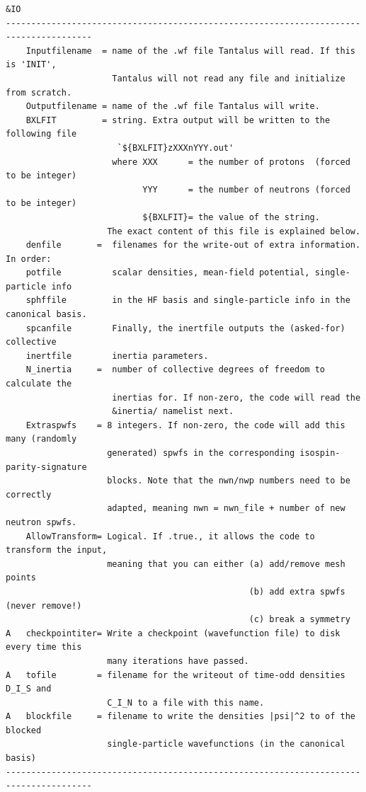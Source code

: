 \documentclass[print,amsmath,amssymb,aps,prc,nofootinbib,notitlepage]{revtex4-1}
\begin{document}
\begin{Verbatim}
&IO
---------------------------------------------------------------------------------------
    Inputfilename  = name of the .wf file Tantalus will read. If this is 'INIT', 
                     Tantalus will not read any file and initialize from scratch.
    Outputfilename = name of the .wf file Tantalus will write.
    BXLFIT         = string. Extra output will be written to the following file 
                      `${BXLFIT}zXXXnYYY.out'
                     where XXX      = the number of protons  (forced to be integer)
                           YYY      = the number of neutrons (forced to be integer)
                           ${BXLFIT}= the value of the string.
                    The exact content of this file is explained below.
    denfile       =  filenames for the write-out of extra information. In order: 
    potfile          scalar densities, mean-field potential, single-particle info
    sphffile         in the HF basis and single-particle info in the canonical basis.
    spcanfile        Finally, the inertfile outputs the (asked-for) collective 
    inertfile        inertia parameters.
    N_inertia     =  number of collective degrees of freedom to calculate the 
                     inertias for. If non-zero, the code will read the
                     &inertia/ namelist next.
    Extraspwfs    = 8 integers. If non-zero, the code will add this many (randomly
                    generated) spwfs in the corresponding isospin-parity-signature
                    blocks. Note that the nwn/nwp numbers need to be correctly 
                    adapted, meaning nwn = nwn_file + number of new neutron spwfs.
    AllowTransform= Logical. If .true., it allows the code to transform the input, 
                    meaning that you can either (a) add/remove mesh points
                                                (b) add extra spwfs (never remove!)
                                                (c) break a symmetry
A   checkpointiter= Write a checkpoint (wavefunction file) to disk every time this
                    many iterations have passed.
A   tofile        = filename for the writeout of time-odd densities D_I_S and 
                    C_I_N to a file with this name. 
A   blockfile     = filename to write the densities |psi|^2 to of the blocked
                    single-particle wavefunctions (in the canonical basis)
---------------------------------------------------------------------------------------
\end{Verbatim}
\end{document}
